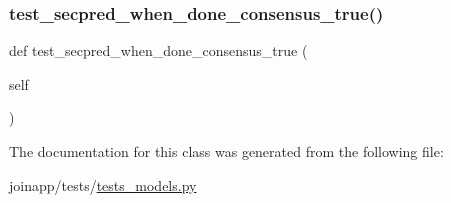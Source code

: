 \mbox{\label{classjoinapp_1_1tests_1_1tests__models_1_1_secondary___pred___tests_ae1c47b8f51412251935f1c8faeaf1242}} 
\subsubsection{\texorpdfstring{test\_secpred\_when\_done\_consensus\_true()}{test\_secpred\_when\_done\_consensus\_true()}}
{\footnotesize\ttfamily def test\+\_\+secpred\+\_\+when\+\_\+done\+\_\+consensus\+\_\+true (\begin{DoxyParamCaption}\item[{}]{self }\end{DoxyParamCaption})}



The documentation for this class was generated from the following file\+:\begin{DoxyCompactItemize}
\item 
joinapp/tests/\mbox{\hyperlink{tests__models_8py}{tests\+\_\+models.\+py}}\end{DoxyCompactItemize}
